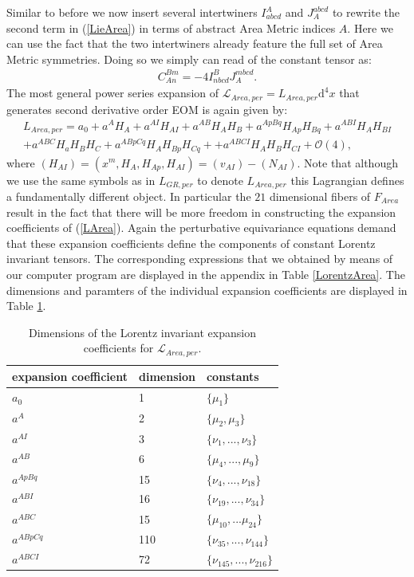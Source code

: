 \documentclass[a4paper,12pt, DIV=14, BCOR=5mm, twoside, headsepline, numbers=noenddot]{scrbook}
\begin{document}
Similar to before we now insert several intertwiners $I^A_{abcd}$ and $J_A^{abcd}$ to rewrite the second term in (\ref{LieArea}) in terms of abstract Area Metric indices $A$. Here we can use the fact that the two intertwiners already feature the full set of Area Metric symmetries.  Doing so we simply can read of the constant tensor as:
\begin{align}\label{areaGotayMInter}
    C_{An}^{Bm} = -4 I^B_{nbcd} J_A^{mbcd}.
\end{align}
The most general power series expansion of $\mathcal{L}_{Area,per} = L_{Area,per}\mathrm{d}^4x$ that generates second derivative order EOM is again given by:
\begin{align}\label{LArea}
    L_{Area,per} =  a_0 + a^A H_A + a^{AI}H_{AI} + a^{AB} H_{A}H_{B} + a^{ApBq} H_{Ap}H_{Bq} + a^{ABI} H_{A} H_{BI} \\
    + a^{ABC} H_a H_B H_C + a^{ABpCq} H_{A}H_{Bp}H_{Cq} +
    + a^{ABCI} H_A H_B H_{CI} 
    + \mathcal{O}(4),
\end{align}
where $(H_{AI}) = (x^m,H_A,H_{Ap},H_{AI}) = (v_{AI}) - (N_{AI})$. Note that although we use the same symbols as in $L_{GR,per}$ to denote $L_{Area,per}$ this Lagrangian defines a fundamentally different object. In particular the $21$ dimensional fibers of  $F_{Area}$ result in the fact that there will be more freedom in constructing the expansion coefficients of (\ref{LArea}). Again the perturbative equivariance equations demand that these expansion coefficients define the components of constant Lorentz invariant tensors. The corresponding expressions that we obtained by means of our computer program are displayed in the appendix in Table \ref{LorentzArea}. The dimensions and paramters of the individual expansion coefficients are displayed in Table \ref{AreaExp}.
\begin{table}
\centering 
\begin{tabular}{lll} \toprule
    expansion coefficient & dimension & constants   \\ \midrule
    $a_0$ & 1 & $\{\mu_1\}$ \\
    $a^A$ & 2 & $\{\mu_2,\mu_3\}$ \\
    $a^{AI}$ & 3 & $\{\nu_1,..., \nu_3\}$ \\
    $a^{AB}$ & 6 & $\{\mu_4,..., \mu_9 \} $ \\
    $a^{ApBq}$ & 15 & $\{\nu_4,...,\nu_{18}\}$ \\
    $a^{ABI}$ & 16 & $\{ \nu_{19},...,\nu_{34} \}$ \\
    $a^{ABC}$ & 15 & $\{ \mu_{10},...\mu_{24} \}$\\
    $a^{ABpCq}$ & 110 & $\{\nu_{35},...,\nu_{144} \}$ \\
    $a^{ABCI}$ & 72 & $\{ \nu_{145},...,\nu_{216}\}$ \\ \bottomrule
\end{tabular}
\caption{Dimensions of the Lorentz invariant expansion coefficients for $\mathcal{L}_{Area,per}$.}\label{AreaExp}
\end{table}
\end{document}
